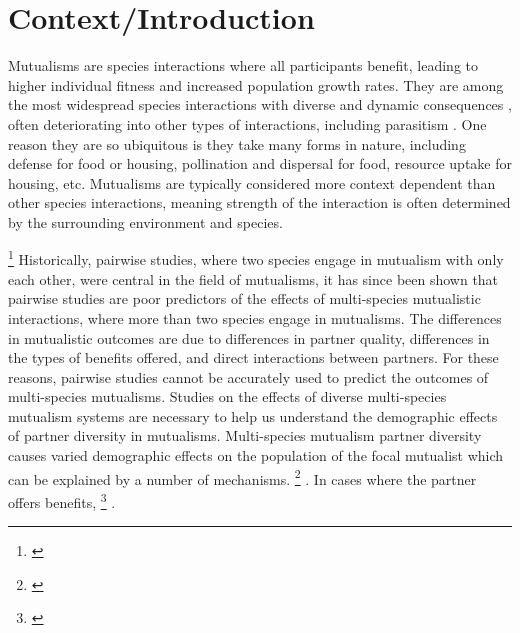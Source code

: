 \documentclass[12pt,a4paper]{article}
\newcommand{\ali}[2]{{\color{pink}{#1}}\footnote{\textit{\color{pink}{#2}}}}
\begin{document}
\section*{Context/Introduction}

Mutualisms are species interactions where all participants benefit, leading to higher individual fitness and increased population growth rates. 
They are among the most widespread species interactions\cite{Chamberlain2014, BoucherDouglasH.1985} with diverse and dynamic consequences \cite{Bronstein1994,Chamberlain2014,Frederickson2013}, often deteriorating into other types of interactions, including parasitism \cite{Rodriguez-Rodriguez2017,Song2020,Mandyam2014,Thrall2007, Bahia2022}.
One reason they are so ubiquitous is they take many forms in nature, including defense for food or housing\cite{Willmer1997}, pollination and dispersal for food\cite{Sakai2002,Burns2004}, resource uptake for housing\cite{Holland2010}, etc. 
Mutualisms are typically considered more context dependent than other species interactions\cite{Chamberlain2014,Frederickson2013}, meaning strength of the interaction is often determined by the surrounding environment and species. 

\ali{}{I don't love this paragraph. Help. I particularly don't like how I defined multispecies mutualisms vs pairwise}
Historically, pairwise studies, where two species engage in mutualism with only each other, were central in the field of mutualisms, it has since been shown that pairwise studies are poor predictors of the effects of multi-species mutualistic interactions\cite{Afkhami2014,Palmer2010}, where more than two species engage in mutualisms.
The differences in mutualistic outcomes are due to differences in partner quality\cite{Bascompte2019,Stanton2013,Frederickson2013,Jones2015, Ness2006}, differences in the types of benefits offered\cite{Kiers2003,Afkhami2014}, and direct interactions between partners\cite{Sun2019,Heath2009,Heath2014,Grutter2003}.
For these reasons, pairwise studies cannot be accurately used to predict the outcomes of multi-species mutualisms\cite{Palmer2010, Stanton2013, Chamberlain2014, Song2020}.
Studies on the effects of diverse multi-species mutualism systems are necessary to help us understand the demographic effects of partner diversity in mutualisms\cite{Bascompte2019}. 
Multi-species mutualism partner diversity causes varied demographic effects on the population of the focal mutualist which can be explained by a number of mechanisms.
\ali{In some cases, the quality of the benefits offered varies leading to some partners which benefit the individual, some which have neither a positive or negative impact on the individual, and some which negatively impact the host}{Is this the best way to introduce this or should I talk about quality of benefits compared to cost of rewards? AKA some partners offer a net benefit when the benefits outweigh the cost of rewards to the partner ... etc.} \cite{Bronstein1994,Bronstein2001a,Afkhami2014,Song2020,West2007,Frederickson2013,Jones2015}. In cases where the partner offers benefits, \ali{the function, or type of benefits, offered by the partner can vary}{Is this enough detail or do I need to go into examples?} \cite{Stanton2003}.
\end{document}
